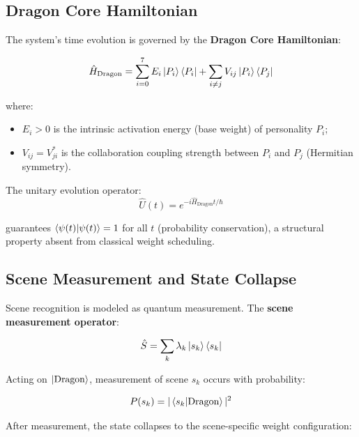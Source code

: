 \documentclass[conference]{IEEEtran}
\begin{document}
\subsection{Dragon Core Hamiltonian}

The system's time evolution is governed by the
\textbf{Dragon Core Hamiltonian}:

\begin{equation}
  \hat{H}_{\text{Dragon}} = \sum_{i=0}^{7} E_i \ket{P_i}\bra{P_i}
    + \sum_{i \neq j} V_{ij} \ket{P_i}\bra{P_j}
  \label{eq:hamiltonian}
\end{equation}

where:
\begin{itemize}
  \item $E_i > 0$ is the intrinsic activation energy
        (base weight) of personality $P_i$;
  \item $V_{ij} = V_{ji}^*$ is the collaboration coupling
        strength between $P_i$ and $P_j$ (Hermitian symmetry).
\end{itemize}

The unitary evolution operator:
\begin{equation}
  \hat{U}(t) = e^{-i\hat{H}_{\text{Dragon}}t/\hbar}
  \label{eq:unitary}
\end{equation}

guarantees $\braket{\psi(t)}{\psi(t)} = 1$ for all $t$
(probability conservation), a structural property absent
from classical weight scheduling.

\subsection{Scene Measurement and State Collapse}

Scene recognition is modeled as quantum measurement.
The \textbf{scene measurement operator}:

\begin{equation}
  \hat{S} = \sum_{k} \lambda_k \ket{s_k}\bra{s_k}
  \label{eq:measurement}
\end{equation}

Acting on $\ket{\text{Dragon}}$, measurement of scene
$s_k$ occurs with probability:

\begin{equation}
  P(s_k) = |\braket{s_k}{\text{Dragon}}|^2
  \label{eq:collapse_prob}
\end{equation}

After measurement, the state collapses to the scene-specific
weight configuration:
\end{document}
